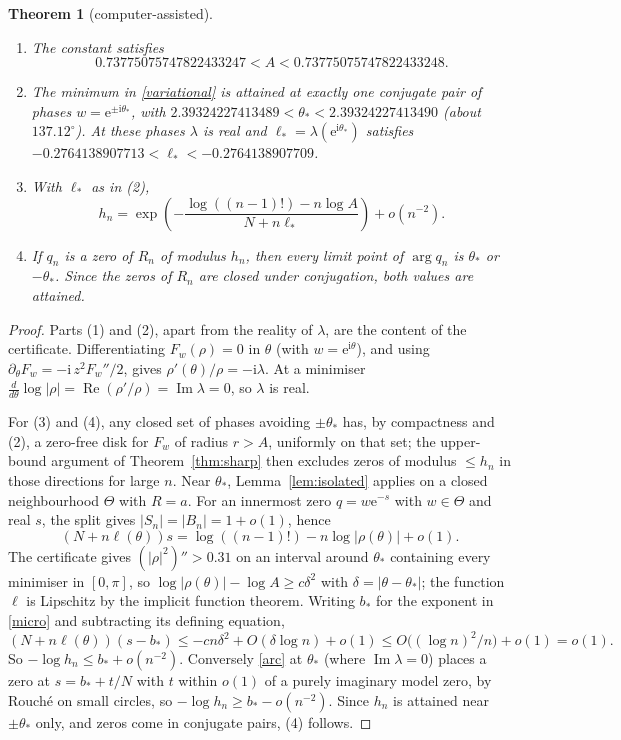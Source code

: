\documentclass[11pt,a4paper]{article}
\newtheorem{theorem}{Theorem}
\theoremstyle{remark}
\newcommand{\e}{\mathrm e}
\newcommand{\ii}{\mathrm i}
\newcommand{\Rea}{\operatorname{Re}}
\newcommand{\Ima}{\operatorname{Im}}
\begin{document}
\begin{theorem}[computer-assisted]\label{thm:micro}
\begin{enumerate}
\item The constant satisfies \[0.73775075747822433247<A<0.73775075747822433248.\]
\item The minimum in \eqref{variational} is attained at exactly one conjugate pair of phases $w=\e^{\pm\ii\theta_*}$, with $2.39324227413489<\theta_*<2.39324227413490$ (about $137.12^\circ$). At these phases $\lambda$ is real and $\ell_*=\lambda(\e^{\ii\theta_*})$ satisfies $-0.2764138907713<\ell_*<-0.2764138907709$.
\item With $\ell_*$ as in (2),
\begin{equation}\label{micro}
h_n=\exp\!\left(-\frac{\log((n-1)!)-n\log A}{N+n\ell_*}\right)+o(n^{-2}).
\end{equation}
\item If $q_n$ is a zero of $R_n$ of modulus $h_n$, then every limit point of $\arg q_n$ is $\theta_*$ or $-\theta_*$. Since the zeros of $R_n$ are closed under conjugation, both values are attained.
\end{enumerate}
\end{theorem}
\begin{proof}
Parts (1) and (2), apart from the reality of $\lambda$, are the content of the certificate. Differentiating $F_w(\rho)=0$ in $\theta$ (with $w=\e^{\ii\theta}$), and using $\partial_\theta F_w=-\ii\,z^2F_w''/2$, gives $\rho'(\theta)/\rho=-\ii\lambda$. At a minimiser $\frac{d}{d\theta}\log|\rho|=\Rea(\rho'/\rho)=\Ima\lambda=0$, so $\lambda$ is real.

For (3) and (4), any closed set of phases avoiding $\pm\theta_*$ has, by compactness and (2), a zero-free disk for $F_w$ of radius $r>A$, uniformly on that set; the upper-bound argument of Theorem~\ref{thm:sharp} then excludes zeros of modulus $\le h_n$ in those directions for large $n$. Near $\theta_*$, Lemma~\ref{lem:isolated} applies on a closed neighbourhood $\Theta$ with $R=a$. For an innermost zero $q=w\e^{-s}$ with $w\in\Theta$ and real $s$, the split gives $|S_n|=|B_n|=1+o(1)$, hence
\[
(N+n\ell(\theta))s=\log((n-1)!)-n\log|\rho(\theta)|+o(1).
\]
The certificate gives $(|\rho|^2)''>0.31$ on an interval around $\theta_*$ containing every minimiser in $[0,\pi]$, so $\log|\rho(\theta)|-\log A\ge c\delta^2$ with $\delta=|\theta-\theta_*|$; the function $\ell$ is Lipschitz by the implicit function theorem. Writing $b_*$ for the exponent in \eqref{micro} and subtracting its defining equation,
\[
(N+n\ell(\theta))(s-b_*)\le-cn\delta^2+O(\delta\log n)+o(1)\le O\bigl((\log n)^2/n\bigr)+o(1)=o(1).
\]
So $-\log h_n\le b_*+o(n^{-2})$. Conversely \eqref{arc} at $\theta_*$ (where $\Ima\lambda=0$) places a zero at $s=b_*+t/N$ with $t$ within $o(1)$ of a purely imaginary model zero, by Rouch\'e on small circles, so $-\log h_n\ge b_*-o(n^{-2})$. Since $h_n$ is attained near $\pm\theta_*$ only, and zeros come in conjugate pairs, (4) follows.
\end{proof}
\end{document}
